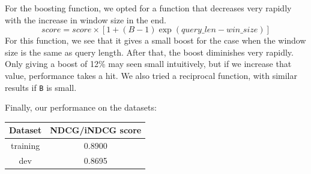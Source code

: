 \documentclass[10pt,twocolumn]{article}
\begin{document}
For the boosting function, we opted for a function that decreases very rapidly with the increase in window size in the end.
\begin{equation*}
score = score \times [1+(B-1)\exp(query\_len-win\_size)]
\end{equation*}
For this function, we see that it gives a small boost for the case when the window size is the same as query length. After that, the boost diminishes very rapidly. Only giving a boost of 12\% may seen small intuitively, but if we increase that value, performance takes a hit. We also tried a reciprocal function, with similar results if \texttt{B} is small.

Finally, our performance on the datasets:
\begin{table}[H]
\centering
\begin{tabular}{|c|c|}
\hline
Dataset & NDCG/iNDCG score \\\hline
training & 0.8900\\\hline
dev & 0.8695\\\hline
\end{tabular}
\end{table}
\end{document}
